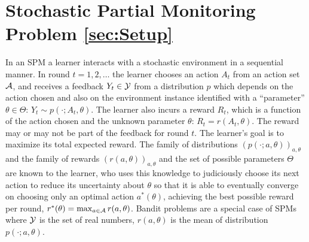 \section*{Stochastic Partial Monitoring Problem \ref{sec:Setup}}
In an SPM a learner interacts with a stochastic environment in a sequential manner.
In round $t=1,2,\dots$ the learner chooses an action $A_t$ from an action set $\mathcal{A}$, and receives a feedback $Y_t\in \mathcal{Y}$
from a distribution $p$ which depends on the action chosen and also on the environment instance identified
with a ``parameter'' $\theta\in\Theta$:
$Y_t \sim p(\cdot;A_t,\theta)$. 
The learner also incurs a reward $R_t$, which is a function of the action chosen and the unknown parameter $\theta$:
$R_t = r(A_t,\theta)$. 
The reward may or may not be part of the feedback for round $t$.
The learner's goal is to maximize its total expected reward.
The family of distributions $(p(\cdot;a,\theta))_{a,\theta}$ and the family of rewards $(r(a,\theta))_{a,\theta}$
and the set of possible parameters $\Theta$ are known to the learner, who uses this knowledge to judiciously choose
its next action to reduce its uncertainty about $\theta$ so that it is able to eventually converge on choosing only an 
optimal action $a^*(\theta)$, achieving the best possible reward per round, $r^*(\theta) = \max_{a\in \mathcal{A}} r(a,\theta)$.  Bandit problems are a special case of SPMs where $\mathcal{Y}$ is the set of real numbers, $r(a,\theta)$ is the mean of distribution $p(\cdot;a,\theta)$.



